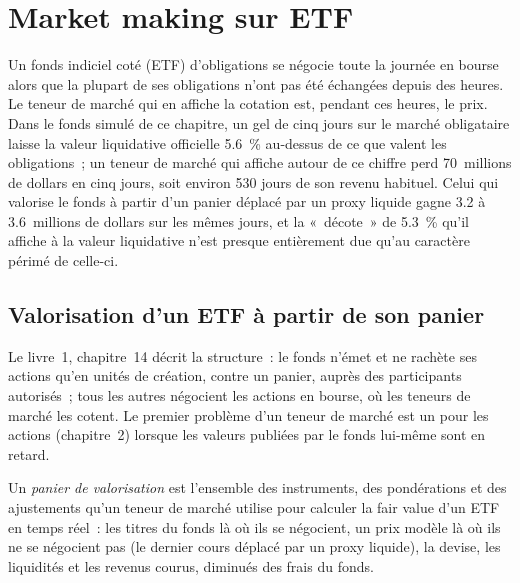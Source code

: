\chapter{Market making sur ETF}\label{ch:hf:etf-market-making}

Un fonds indiciel coté (ETF) d'obligations se négocie toute la journée en bourse alors que la plupart de ses obligations n'ont pas été échangées depuis des heures. Le teneur de marché qui
en affiche la cotation est, pendant ces heures, le prix. Dans le fonds simulé de ce chapitre, un gel de cinq jours sur le marché obligataire laisse la valeur liquidative officielle
5.6~\% au-dessus de ce que valent les obligations~; un teneur de marché qui affiche autour de ce chiffre perd 70~millions de dollars en cinq jours, soit environ 530 jours de son
revenu habituel. Celui qui valorise le fonds à partir d'un panier déplacé par un proxy liquide gagne 3.2 à 3.6~millions de dollars sur les mêmes jours, et la «~décote~» de 5.3~\% qu'il affiche
à la valeur liquidative n'est presque entièrement due qu'au caractère périmé de celle-ci.

\section{Valorisation d'un ETF à partir de son panier}

Le livre~1, chapitre~14 décrit la structure~: le fonds n'émet et ne rachète ses actions qu'en unités de création, contre un panier, auprès des participants autorisés~;
tous les autres négocient les actions en bourse, où les teneurs de marché les cotent. Le premier problème d'un teneur de marché est un  pour les actions
(chapitre~2) lorsque les valeurs publiées par le fonds lui-même sont en retard.

\begin{definition}\label{def:hf:etf-market-making:pricing}
Un \emph{panier de valorisation} est l'ensemble des instruments, des pondérations et des ajustements qu'un teneur de marché utilise pour calculer la fair value d'un ETF
en temps réel~: les titres du fonds là où ils se négocient, un prix modèle là où ils ne se négocient pas (le dernier cours déplacé par un proxy liquide), la devise, les
liquidités et les revenus courus, diminués des frais du fonds.
\end{definition}

